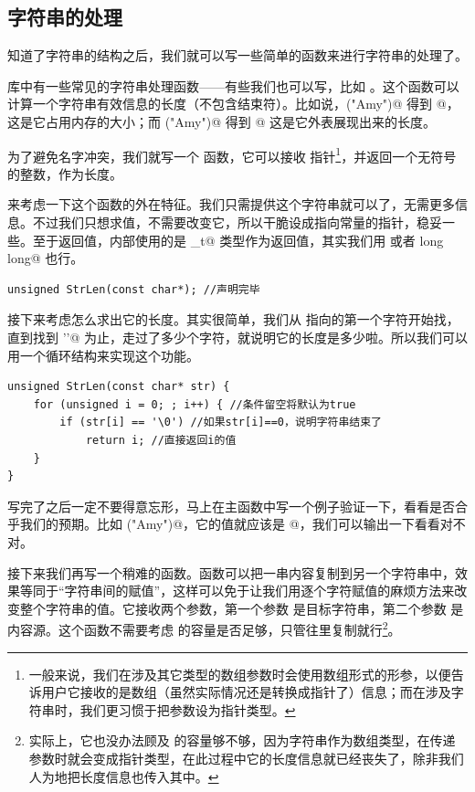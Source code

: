 \subsection*{字符串的处理}
知道了字符串的结构之后，我们就可以写一些简单的函数来进行字符串的处理了。\par
\lstinline@cstring@ 库中有一些常见的字符串处理函数——有些我们也可以写，比如 \lstinline@strlen@。这个函数可以计算一个字符串有效信息的长度（不包含结束符）。比如说，\lstinline@sizeof("Amy")@ 得到 @，这是它占用内存的大小；而 \lstinline@strlen("Amy")@ 得到 @ 这是它外表展现出来的长度。\par
为了避免名字冲突，我们就写一个 \lstinline@StrLen@ 函数，它可以接收 \lstinline@char@ 指针\footnote{一般来说，我们在涉及其它类型的数组参数时会使用数组形式的形参，以便告诉用户它接收的是数组（虽然实际情况还是转换成指针了）信息；而在涉及字符串时，我们更习惯于把参数设为指针类型。}，并返回一个无符号的整数，作为长度。\par
来考虑一下这个函数的外在特征。我们只需提供这个字符串就可以了，无需更多信息。不过我们只想求值，不需要改变它，所以干脆设成指向常量的指针，稳妥一些。至于返回值，\lstinline@strlen@ 内部使用的是 \lstinline@size_t@ 类型作为返回值，其实我们用 \lstinline@unsigned@ 或者 \lstinline@unsigned long long@ 也行。\par
\begin{lstlisting}
unsigned StrLen(const char*); //声明完毕
\end{lstlisting}\par
接下来考虑怎么求出它的长度。其实很简单，我们从 \lstinline@str@ 指向的第一个字符开始找，直到找到 \lstinline@'\0'@ 为止，走过了多少个字符，就说明它的长度是多少啦。所以我们可以用一个循环结构来实现这个功能。
\begin{lstlisting}
unsigned StrLen(const char* str) {
    for (unsigned i = 0; ; i++) { //条件留空将默认为true
        if (str[i] == '\0') //如果str[i]==0，说明字符串结束了
            return i; //直接返回i的值
    }
}
\end{lstlisting}\par
写完了之后一定不要得意忘形，马上在主函数中写一个例子验证一下，看看是否合乎我们的预期。比如 \lstinline@StrLen("Amy")@，它的值就应该是 @，我们可以输出一下看看对不对。\par
接下来我们再写一个稍难的函数。\lstinline@strcpy@ 函数可以把一串内容复制到另一个字符串中，效果等同于``字符串间的赋值''，这样可以免于让我们用逐个字符赋值的麻烦方法来改变整个字符串的值。它接收两个参数，第一个参数 \lstinline@dest@ 是目标字符串，第二个参数 \lstinline@src@ 是内容源。这个函数不需要考虑 \lstinline@dest@ 的容量是否足够，只管往里复制就行\footnote{实际上，它也没办法顾及 \lstinline@dest@ 的容量够不够，因为字符串作为数组类型，在传递参数时就会变成指针类型，在此过程中它的长度信息就已经丧失了，除非我们人为地把长度信息也传入其中。}。\par
